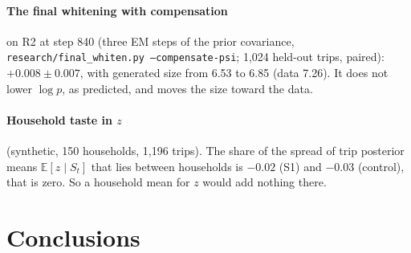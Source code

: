 \documentclass[11pt]{article}
\theoremstyle{remark}\newtheorem{remark}{Remark}
\newcommand{\E}{\mathbb{E}}
\begin{document}
\paragraph{The final whitening with compensation} on R2 at step 840 (three EM steps of the prior
covariance, \texttt{research/final\_whiten.py --compensate-psi}; 1,024 held-out trips, paired):
$+0.008\pm0.007$, with generated size from 6.53 to 6.85 (data 7.26). It does not lower $\log p$, as
predicted, and moves the size toward the data.

\paragraph{Household taste in $z$} (synthetic, 150 households, 1,196 trips). The share of the
spread of trip posterior means $\E[z\mid S_t]$ that lies between households is $-0.02$ (S1) and
$-0.03$ (control), that is zero. So a household mean for $z$ would add nothing there.

\section{Conclusions}\label{sec:conc}
\end{document}
